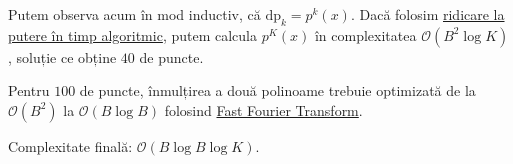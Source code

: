 Putem observa acum în mod inductiv, că $\mathrm{dp}_k = p^k(x)$. Dacă folosim \href{https://en.wikipedia.org/wiki/Exponentiation\_by\_squaring}{ridicare la putere în timp algoritmic}, putem calcula $p^K(x)$ în complexitatea $\mathcal{O}(B^2 \log K)$, soluție ce obține $40$ de puncte.

\medskip

Pentru $100$ de puncte, înmulțirea a două polinoame trebuie optimizată de la $\mathcal{O}(B^2)$ la $\mathcal{O}(B \log B)$ folosind \href{https://usaco.guide/adv/fft?lang=cpp}{Fast Fourier Transform}. 

\medskip

Complexitate finală: $\mathcal{O}(B \log B \log K)$.
